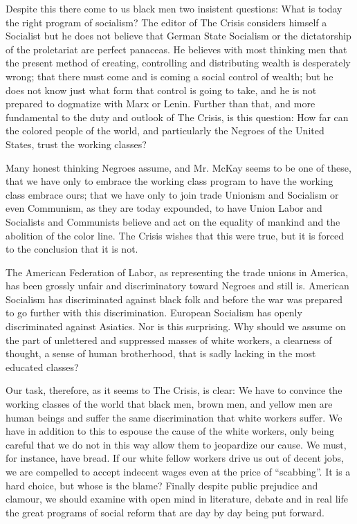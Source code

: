 \documentclass[letterpaper,10pt,english]{jupyterBook}
\begin{document}
\sphinxAtStartPar
Despite this there come to us black men two insistent questions: What is today the right program of socialism? The editor of The Crisis considers himself a Socialist but he does not believe that German State Socialism or the dictatorship of the proletariat are perfect panaceas. He believes with most thinking men that the present method of creating, controlling and distributing wealth is desperately wrong; that there must come and is coming a social control of wealth; but he does not know just what form that control is going to take, and he is not prepared to dogmatize with Marx or Lenin. Further than that, and more fundamental to the duty and outlook of The Crisis, is this question: How far can the colored people of the world, and particularly the Negroes of the United States, trust the working classes?

\sphinxAtStartPar
Many honest thinking Negroes assume, and Mr. McKay seems to be one of these, that we have only to embrace the working class program to have the working class embrace ours; that we have only to join trade Unionism and Socialism or even Communism, as they are today expounded, to have Union Labor and Socialists and Communists believe and act on the equality of mankind and the abolition of the color line. The Crisis wishes that this were true, but it is forced to the conclusion that it is not.

\sphinxAtStartPar
The American Federation of Labor, as representing the trade unions in America, has been grossly unfair and discriminatory toward Negroes and still is. American Socialism has discriminated against black folk and before the war was prepared to go further with this discrimination. European Socialism has openly discriminated against Asiatics. Nor is this surprising. Why should we assume on the part of unlettered and suppressed masses of white workers, a clearness of thought, a sense of human brotherhood, that is sadly lacking in the most educated classes?

\sphinxAtStartPar
Our task, therefore, as it seems to The Crisis, is clear: We have to convince the working classes of the world that black men, brown men, and yellow men are human beings and suffer the same discrimination that white workers suffer. We have in addition to this to espouse the cause of the white workers, only being careful that we do not in this way allow them to jeopardize our cause. We must, for instance, have bread. If our white fellow workers drive us out of decent jobs, we are compelled to accept indecent wages even at the price of “scabbing”. It is a hard choice, but whose is the blame? Finally despite public prejudice and clamour, we should examine with open mind in literature, debate and in real life the great programs of social reform that are day by day being put forward.
\end{document}
